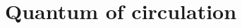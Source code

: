 \hypertarget{group___quantum_circulation}{}\section{Quantum of circulation}
\label{group___quantum_circulation}
